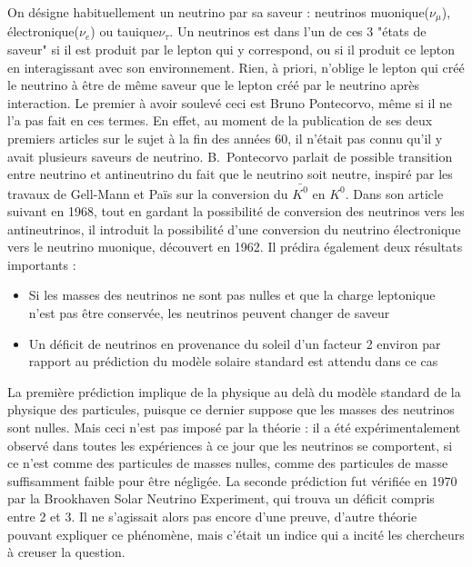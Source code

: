             On désigne habituellement un neutrino par sa saveur : neutrinos muonique($\nu_{\mu}$), électronique($\nu_e$) ou tauique$\nu_{\tau}$. Un neutrinos est dans l'un de ces 3 "états de saveur" si il est produit par le lepton qui y correspond, ou si il produit ce lepton en interagissant avec son environnement. Rien, à priori, n'oblige le lepton qui créé le neutrino à être de même saveur que le lepton créé par le neutrino après interaction. Le premier à avoir soulevé ceci est Bruno Pontecorvo, même si il ne l'a pas fait en ces termes. En effet, au moment de la publication de ses deux premiers articles\cite{Pontecorvo:1957cp,Pontecorvo:1957qd} sur le sujet à la fin des années 60, il n'était pas connu qu'il y avait plusieurs saveurs de neutrino. B.~Pontecorvo parlait de possible transition entre neutrino et antineutrino du fait que le neutrino soit neutre, inspiré par les travaux de Gell-Mann et Païs\cite{Gell-Mann1955} sur la conversion du $\bar{K^0}$ en  $K^0$. Dans son article suivant en 1968\cite{Pontecorvo1968}, tout en gardant la possibilité de conversion des neutrinos vers les antineutrinos, il introduit la possibilité d'une conversion du neutrino électronique vers le neutrino muonique, découvert en 1962\cite{Danby1962}. Il prédira également deux résultats importants :
            \begin{itemize}
                \item Si les masses des neutrinos ne sont pas nulles et que la charge leptonique n'est pas être conservée, les neutrinos peuvent changer de saveur
                \item Un déficit de neutrinos en provenance du soleil d'un facteur 2 environ par rapport au prédiction du modèle solaire standard est attendu dans ce cas
            \end{itemize}
            La première prédiction implique de la physique au delà du modèle standard de la physique des particules, puisque ce dernier suppose que les masses des neutrinos sont nulles. Mais ceci n'est pas imposé par la théorie : il a été expérimentalement observé dans toutes les expériences à ce jour que les neutrinos se comportent, si ce n'est comme des particules de masses nulles, comme des particules de masse suffisamment faible pour être négligée. 
            La seconde prédiction fut vérifiée en 1970 par la Brookhaven Solar Neutrino Experiment\cite{Bahcall1976}, qui trouva un déficit compris entre 2 et 3. Il ne s'agissait alors pas encore d'une preuve, d'autre théorie pouvant expliquer ce phénomène, mais c'était un indice qui a incité les chercheurs à creuser la question.
            

